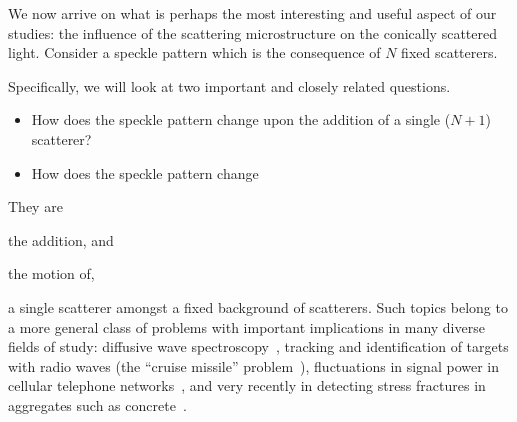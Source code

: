 We now arrive on what is perhaps the most interesting and useful aspect of
our studies: the influence of the scattering microstructure on the
conically scattered light.  Consider a speckle pattern which is the
consequence of $N$ fixed scatterers.  

Specifically, we will look at two important and
closely related questions.  

\begin{itemize}
\item How does the speckle pattern change upon the addition of a single
				($N+1$) scatterer?  
\item How does the speckle pattern change 
\end{itemize}


They are%
\begin{inparaenum}[(a)]
\item the addition, and
\item the motion of,
\end{inparaenum} %
a single scatterer amongst a fixed background of scatterers.  Such topics
belong to a more general class of problems with important implications in
many diverse fields of study: diffusive wave
spectroscopy~\cite{pine1988diffusing}, tracking and identification of
targets with radio waves (the ``cruise missile''
problem~\cite{atkins1991neural}), fluctuations in signal power in cellular
telephone networks~\cite{abdi2001estimation}, and very recently in
detecting stress fractures in aggregates such as
concrete~\cite{larose2010locating}.
